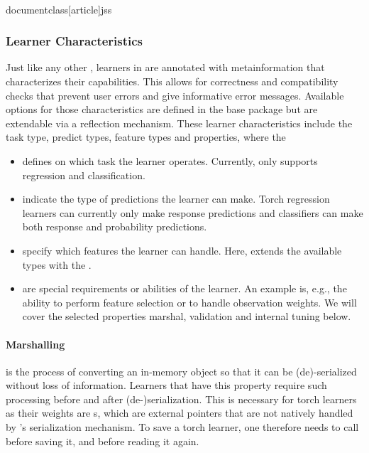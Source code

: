 \\documentclass[article]{jss}
\theoremstyle{definition}
\begin{document}
\subsubsection{Learner Characteristics}\label{sec:learner-characteristics}

Just like any other , learners in  are annotated with metainformation that characterizes their capabilities.
This allows for correctness and compatibility checks that prevent user errors and give informative error messages.
Available options for those characteristics are defined in the  base package but are extendable via a reflection mechanism.
These learner characteristics include the task type, predict types, feature types and properties, where the

\begin{itemize}
    \item {} defines on which task the learner operates. Currently,  only supports regression and classification.
    \item {} indicate the type of predictions the learner can make. Torch regression learners can currently only make response predictions and classifiers can make both response and probability predictions.
    \item {} specify which features the learner can handle. Here, \mlrttorch{} extends the available types with the .
    \item {} are special requirements or abilities of the learner. An example is, e.g., the ability to perform feature selection or to handle observation weights. We will cover the selected properties marshal, validation and internal tuning below.
\end{itemize}


\paragraph{Marshalling} is the process of converting an in-memory object so that it can be (de)-serialized without loss of information.
Learners that have this property require such processing before and after (de-)serialization.
This is necessary for torch learners as their weights are s, which are external pointers that are not natively handled by \rlang{}'s serialization mechanism.
To save a torch learner, one therefore needs to call  before saving it, and  before reading it again.
\end{document}
